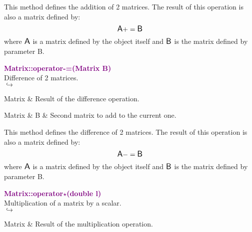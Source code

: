 This method defines the addition of 2 matrices.
The result of this operation is also a matrix defined by:
\begin{equation*}
\mbox{\large\ensuremath{\mathsf{A}}} += \mbox{\large\ensuremath{\mathsf{B}}}
\end{equation*}
where $\mbox{\large\ensuremath{\mathsf{A}}}$ is a matrix defined by the object itself and $\mbox{\large\ensuremath{\mathsf{B}}}$ is the matrix defined by parameter B.

\textcolor{purple}{\textbf{Matrix::operator-=(Matrix B)}}\label{Matrix::operator-=(Matrix B)}\\
Difference of 2 matrices.\\ \hspace*{5mm}$\hookrightarrow$
\vspace*{-2em}\begin{tcolorbox}[grow to left by=-1cm, width=\textwidth-1cm,myArgs,tabularx={l|R}]
Matrix & Result of the difference operation.
\end{tcolorbox}

\begin{tcolorbox}[width=\textwidth,myArgs,tabularx={ll|R}]
Matrix & B & Second matrix to add to the current one.
\end{tcolorbox}

This method defines the difference of 2 matrices.
The result of this operation is also a matrix defined by:
\begin{equation*}
\mbox{\large\ensuremath{\mathsf{A}}} -= \mbox{\large\ensuremath{\mathsf{B}}}
\end{equation*}
where $\mbox{\large\ensuremath{\mathsf{A}}}$ is a matrix defined by the object itself and $\mbox{\large\ensuremath{\mathsf{B}}}$ is the matrix defined by parameter B.

\textcolor{purple}{\textbf{Matrix::operator$\star$(double l)}}\label{Matrix::operator*(double l)}\\
Multiplication of a matrix by a scalar.\\ \hspace*{5mm}$\hookrightarrow$
\vspace*{-2em}\begin{tcolorbox}[grow to left by=-1cm, width=\textwidth-1cm,myArgs,tabularx={l|R}]
Matrix & Result of the multiplication operation.
\end{tcolorbox}

